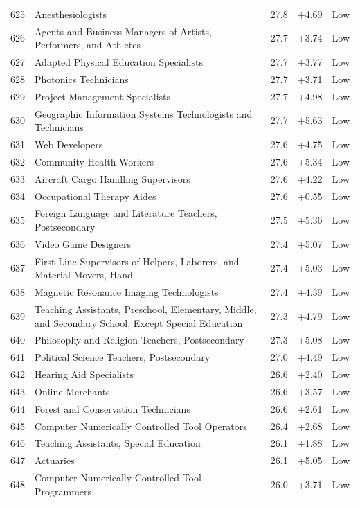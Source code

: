 {\begin{longtable}{rp{7cm}ccc}
625 & Anesthesiologists & 27.8 & +4.69 & Low \\
626 & Agents and Business Managers of Artists, Performers, and Athletes & 27.7 & +3.74 & Low \\
627 & Adapted Physical Education Specialists & 27.7 & +3.77 & Low \\
628 & Photonics Technicians & 27.7 & +3.71 & Low \\
629 & Project Management Specialists & 27.7 & +4.98 & Low \\
630 & Geographic Information Systems Technologists and Technicians & 27.7 & +5.63 & Low \\
631 & Web Developers & 27.6 & +4.75 & Low \\
632 & Community Health Workers & 27.6 & +5.34 & Low \\
633 & Aircraft Cargo Handling Supervisors & 27.6 & +4.22 & Low \\
634 & Occupational Therapy Aides & 27.6 & +0.55 & Low \\
635 & Foreign Language and Literature Teachers, Postsecondary & 27.5 & +5.36 & Low \\
636 & Video Game Designers & 27.4 & +5.07 & Low \\
637 & First-Line Supervisors of Helpers, Laborers, and Material Movers, Hand & 27.4 & +5.03 & Low \\
638 & Magnetic Resonance Imaging Technologists & 27.4 & +4.39 & Low \\
639 & Teaching Assistants, Preschool, Elementary, Middle, and Secondary School, Except Special Education & 27.3 & +4.79 & Low \\
640 & Philosophy and Religion Teachers, Postsecondary & 27.3 & +5.08 & Low \\
641 & Political Science Teachers, Postsecondary & 27.0 & +4.49 & Low \\
642 & Hearing Aid Specialists & 26.6 & +2.40 & Low \\
643 & Online Merchants & 26.6 & +3.57 & Low \\
644 & Forest and Conservation Technicians & 26.6 & +2.61 & Low \\
645 & Computer Numerically Controlled Tool Operators & 26.4 & +2.68 & Low \\
646 & Teaching Assistants, Special Education & 26.1 & +1.88 & Low \\
647 & Actuaries & 26.1 & +5.05 & Low \\
648 & Computer Numerically Controlled Tool Programmers & 26.0 & +3.71 & Low \\

\end{longtable}}
